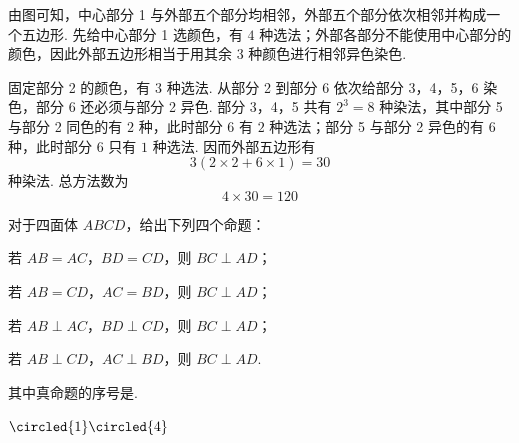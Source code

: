 \begin{solution}
由图可知，中心部分 1 与外部五个部分均相邻，外部五个部分依次相邻并构成一个五边形. 先给中心部分 1 选颜色，有 \(4\) 种选法；外部各部分不能使用中心部分的颜色，因此外部五边形相当于用其余 \(3\) 种颜色进行相邻异色染色.

固定部分 2 的颜色，有 \(3\) 种选法. 从部分 2 到部分 6 依次给部分 3，4，5，6 染色，部分 6 还必须与部分 2 异色. 部分 3，4，5 共有 \(2^3=8\) 种染法，其中部分 5 与部分 2 同色的有 \(2\) 种，此时部分 6 有 \(2\) 种选法；部分 5 与部分 2 异色的有 \(6\) 种，此时部分 6 只有 \(1\) 种选法. 因而外部五边形有
\[
3\left(2\times2+6\times1\right)=30
\]
种染法. 总方法数为
\[
4\times30=120
\]
\end{solution}

\begin{problem}
对于四面体 \(ABCD\)，给出下列四个命题：

\begin{circlelist}
\item 若 \(AB = AC\)，\(BD = CD\)，则 \(BC \perp AD\)；
\item 若 \(AB = CD\)，\(AC = BD\)，则 \(BC \perp AD\)；
\item 若 \(AB \perp AC\)，\(BD \perp CD\)，则 \(BC \perp AD\)；
\item 若 \(AB \perp CD\)，\(AC \perp BD\)，则 \(BC \perp AD\).
\end{circlelist}

其中真命题的序号是\fillinblank{}.
\end{problem}

\begin{answer}
\(\circled{1}\circled{4}\)
\end{answer}

